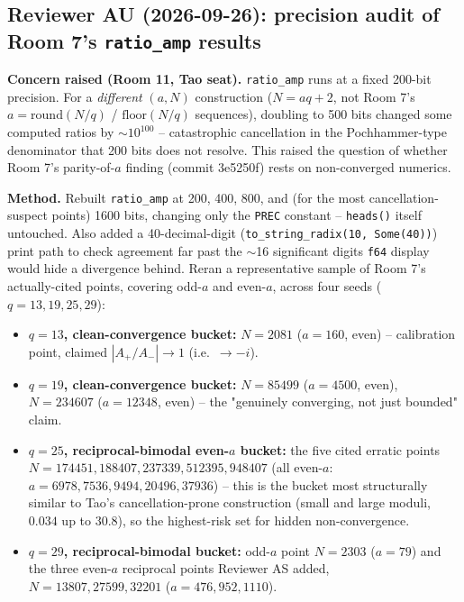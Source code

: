 \subsection*{Reviewer AU (2026-09-26): precision audit of Room 7's \texttt{ratio\_amp} results}

\textbf{Concern raised (Room 11, Tao seat).} \texttt{ratio\_amp} runs at a fixed 200-bit
precision. For a \emph{different} $(a,N)$ construction ($N=aq+2$, not Room 7's
$a=\mathrm{round}(N/q)$ / $\mathrm{floor}(N/q)$ sequences), doubling to 500 bits changed some
computed ratios by $\sim\!10^{100}$ -- catastrophic cancellation in the Pochhammer-type
denominator that 200 bits does not resolve. This raised the question of whether Room 7's
parity-of-$a$ finding (commit 3e5250f) rests on non-converged numerics.

\textbf{Method.} Rebuilt \texttt{ratio\_amp} at 200, 400, 800, and (for the most
cancellation-suspect points) 1600 bits, changing only the \texttt{PREC} constant --
\texttt{heads()} itself untouched. Also added a 40-decimal-digit
(\texttt{to\_string\_radix(10, Some(40))}) print path to check agreement far past the $\sim$16
significant digits \texttt{f64} display would hide a divergence behind. Reran a representative
sample of Room 7's actually-cited points, covering odd-$a$ and even-$a$, across four seeds
($q=13,19,25,29$):

\begin{itemize}
\item \textbf{$q=13$, clean-convergence bucket:} $N=2081$ ($a=160$, even) -- calibration point,
  claimed $|A_+/A_-|\to1$ (i.e.\ $\to-i$).
\item \textbf{$q=19$, clean-convergence bucket:} $N=85499$ ($a=4500$, even), $N=234607$
  ($a=12348$, even) -- the "genuinely converging, not just bounded" claim.
\item \textbf{$q=25$, reciprocal-bimodal even-$a$ bucket:} the five cited erratic points
  $N=174451,188407,237339,512395,948407$ (all even-$a$: $a=6978,7536,9494,20496,37936$) --
  this is the bucket most structurally similar to Tao's cancellation-prone construction (small
  and large moduli, $0.034$ up to $30.8$), so the highest-risk set for hidden non-convergence.
\item \textbf{$q=29$, reciprocal-bimodal bucket:} odd-$a$ point $N=2303$ ($a=79$) and the three
  even-$a$ reciprocal points Reviewer AS added, $N=13807,27599,32201$ ($a=476,952,1110$).
\end{itemize}

